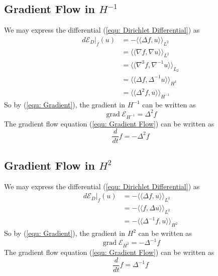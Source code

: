 \documentclass[a4paper]{article}
\newcommand{\llangle}{\langle \langle}
\newcommand{\rrangle}{\rangle \rangle}
\theoremstyle{definition}
\DeclareMathOperator{\grad}{grad}
\begin{document}
\subsection{Gradient Flow in $H^{-1}$}
We may express the differential (\ref{equ: Dirichlet Differential}) as
\begin{align}
    d \mathcal{E}_D|_f (u) &= - \llangle \Delta f, u \rrangle_{L^2} \\
    &= \llangle \nabla f, \nabla u \rrangle_{L^2} \\
    &= \llangle \nabla^3 f, \nabla^{-1} u \rrangle_{L_2} \\
    &= \llangle \Delta f, \Delta^{-1} u \rrangle_{H^1} \\
    &= \llangle \Delta^2 f, u \rrangle_{H^{-1}}
    \label{equ: Gradient H-1 Derivation}
\end{align}
So by (\ref{equ: Gradient}), the gradient in $H^{-1}$ can be written as
\begin{equation}
    \grad \mathcal{E}_{H^{-1}} = \Delta^2 f
    \label{equ: H-1 Gradient}
\end{equation}
The gradient flow equation (\ref{equ: Gradient Flow}) can be written as
\begin{equation}
    \frac{d}{dt}f = - \Delta^2 f
    \label{equ: H-1 Gradient Flow}
\end{equation}

\subsection{Gradient Flow in $H^2$}
We may express the differential (\ref{equ: Dirichlet Differential}) as
\begin{align}
    d \mathcal{E}_D|_f (u) &= - \llangle \Delta f, u \rrangle_{L^2} \\
    &= -\llangle f, \Delta u \rrangle_{L^{2}} \\
    &= -\llangle \Delta^{-1} f, u \rrangle_{H^2}
    \label{equ: Gradient H2 Derivation}
\end{align}
So by (\ref{equ: Gradient}), the gradient in $H^2$ can be written as
\begin{equation}
    \grad \mathcal{E}_{H^2} = - \Delta^{-1} f
    \label{equ: H2 Gradient}
\end{equation}
The gradient flow equation (\ref{equ: Gradient Flow}) can be written as
\begin{equation}
    \frac{d}{dt}f = \Delta^{-1} f
    \label{equ: H2 Gradient Flow}
\end{equation}
\end{document}
